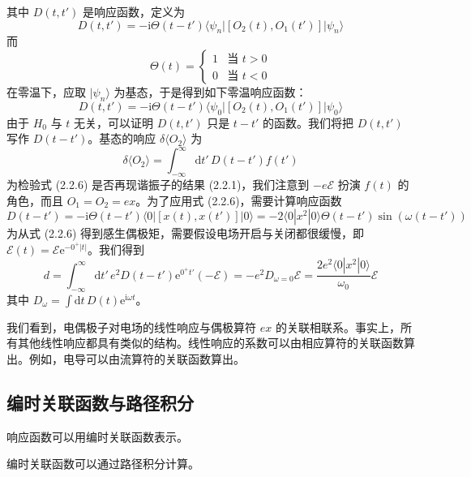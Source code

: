 其中 $D(t,t')$ 是响应函数，定义为
\begin{equation*}
D(t,t')=-\mathrm{i}\Theta(t-t')\langle\psi_n|[O_2(t),O_1(t')]|\psi_n\rangle\tag{2.2.4}
\end{equation*}
而
\begin{equation*}
\Theta(t)=\left\{\begin{array}{ll}
1 & \text{当 } t>0\\
0 & \text{当 } t<0
\end{array}\right.
\end{equation*}
在零温下，应取 $|\psi_n\rangle$ 为基态，于是得到如下零温响应函数：
\begin{equation*}
D(t,t')=-\mathrm{i}\Theta(t-t')\langle\psi_0|[O_2(t),O_1(t')]|\psi_0\rangle\tag{2.2.5}
\end{equation*}
由于 $H_0$ 与 $t$ 无关，可以证明 $D(t,t')$ 只是 $t-t'$ 的函数。我们将把 $D(t,t')$ 写作 $D(t-t')$。基态的响应 $\delta\langle O_2\rangle$ 为
\begin{equation*}
\delta\langle O_2\rangle=\int_{-\infty}^{\infty}\mathrm{d}t'\,D(t-t')f(t')\tag{2.2.6}
\end{equation*}
为检验式 (2.2.6) 是否再现谐振子的结果 (2.2.1)，我们注意到 $-e\mathcal{E}$ 扮演 $f(t)$ 的角色，而且 $O_1=O_2=ex$。为了应用式 (2.2.6)，需要计算响应函数
\begin{equation*}
D(t-t')=-\mathrm{i}\Theta(t-t')\langle 0|[x(t),x(t')]|0\rangle=-2\langle 0|x^2|0\rangle\Theta(t-t')\sin(\omega(t-t'))\tag{2.2.7}
\end{equation*}
为从式 (2.2.6) 得到感生偶极矩，需要假设电场开启与关闭都很缓慢，即 $\mathcal{E}(t)=\mathcal{E}\mathrm{e}^{-0^+|t|}$。我们得到
\begin{equation*}
d=\int_{-\infty}^{\infty}\mathrm{d}t'\,e^2D(t-t')\mathrm{e}^{0^+t'}(-\mathcal{E})=-e^2D_{\omega=0}\mathcal{E}=\frac{2e^2\langle 0|x^2|0\rangle}{\omega_0}\mathcal{E}\tag{2.2.8}
\end{equation*}
其中 $D_\omega=\int\mathrm{d}t\,D(t)\mathrm{e}^{\mathrm{i}\omega t}$。

我们看到，电偶极子对电场的线性响应与偶极算符 $ex$ 的关联相联系。事实上，所有其他线性响应都具有类似的结构。线性响应的系数可以由相应算符的关联函数算出。例如，电导可以由流算符的关联函数算出。

\subsection{编时关联函数与路径积分}

\begin{keypoints}
\item 响应函数可以用编时关联函数表示。
\item 编时关联函数可以通过路径积分计算。
\end{keypoints}

